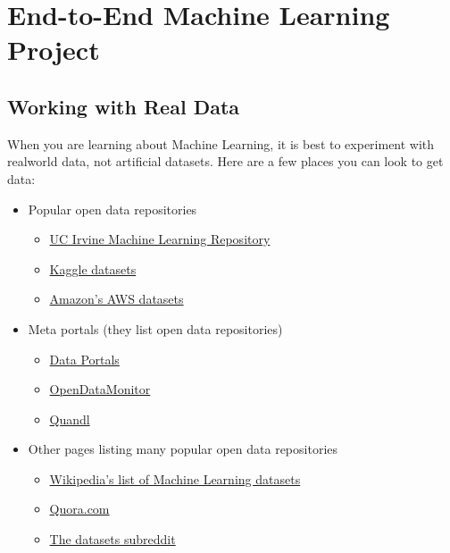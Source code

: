 \chapter{End-to-End Machine Learning Project\label{End-to-End Machine Learning Project}}
\section{Working with Real Data\label{Working with Real Data}}

When you are learning about Machine Learning, it is best to experiment with realworld data, not artificial datasets. Here are a few places you can look
to get data:
\begin{itemize}
\item Popular open data repositories
\begin{itemize}
\item \href{http://archive.ics.uci.edu/ml/index.php}{UC Irvine Machine Learning Repository}

\item \href{https://www.kaggle.com/datasets}{Kaggle datasets}

\item \href{https://registry.opendata.aws/}{Amazon's AWS datasets}
\end{itemize}

\item Meta portals (they list open data repositories)
\begin{itemize}
\item \href{http://dataportals.org/}{Data Portals}

\item \href{http://opendatamonitor.eu/}{OpenDataMonitor}

\item \href{https://data.nasdaq.com/}{Quandl}
\end{itemize}

\item Other pages listing many popular open data repositories
\begin{itemize}
\item \href{https://en.wikipedia.org/wiki/List_of_datasets_for_machine-learning_research}{Wikipedia’s list of Machine Learning datasets}

\item\href{https://www.quora.com/Where-can-I-find-large-datasets-open-to-the-public}{Quora.com}

\item\href{https://www.reddit.com/r/datasets/}{The datasets subreddit}
\end{itemize}
\end{itemize}


